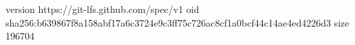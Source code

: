 version https://git-lfs.github.com/spec/v1
oid sha256:b639867f8a158abf17a6c3724e9c3ff75c726ac8cf1a0bcf44c14ae4ed4226d3
size 196704
